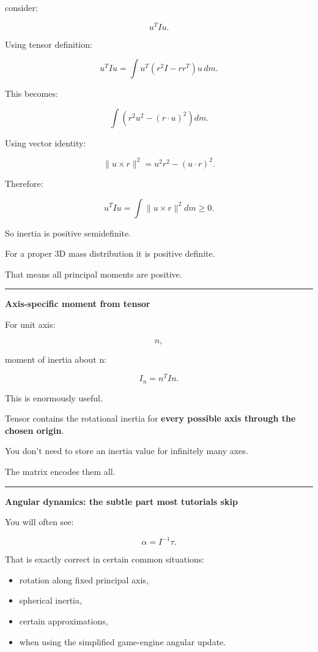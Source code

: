 consider:

\[
u^TIu.
\]

Using tensor definition:

\[
u^TIu
=
\int
u^T
(r^2I-rr^T)
u\,dm.
\]

This becomes:

\[
\int
(
r^2u^2-(r\cdot u)^2
)
dm.
\]

Using vector identity:

\[
\|u\times r\|^2
=
u^2r^2-(u\cdot r)^2.
\]

Therefore:

\[
\boxed{
u^TIu
=
\int
\|u\times r\|^2dm
\ge0.
}
\]

So inertia is positive semidefinite.

For a proper 3D mass distribution it is positive definite.

That means all principal moments are positive.

\begin{center}\rule{0.5\linewidth}{0.5pt}\end{center}

\textbf{Axis-specific moment from tensor}

For unit axis:

\[
n,
\]

moment of inertia about n:

\[
\boxed{
I_n
=
n^TIn.
}
\]

This is enormously useful.

Tensor contains the rotational inertia for \textbf{every possible axis through the chosen origin}.

You don't need to store an inertia value for infinitely many axes.

The matrix encodes them all.

\begin{center}\rule{0.5\linewidth}{0.5pt}\end{center}

\textbf{Angular dynamics: the subtle part most tutorials skip}

You will often see:

\[
\alpha
=
I^{-1}\tau.
\]

That is exactly correct in certain common situations:

\begin{itemize}
\tightlist
\item
  rotation along fixed principal axis,
\item
  spherical inertia,
\item
  certain approximations,
\item
  when using the simplified game-engine angular update.
\end{itemize}

